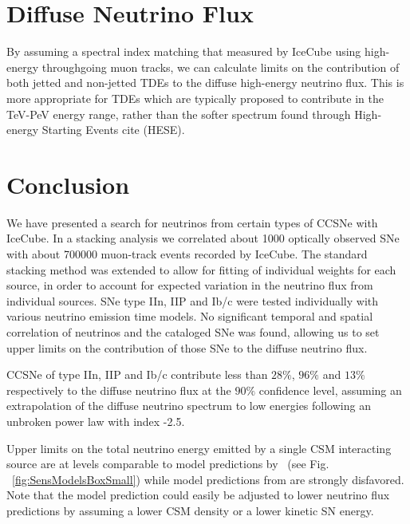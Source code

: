 \documentclass[twocolumn, tighten, linenumbers]{aastex62}
\begin{document}
\section{Diffuse Neutrino Flux}
\label{sec:DiffuseNeutrinoFlux}

By assuming a spectral index matching that measured by IceCube using high-energy throughgoing muon tracks, we can calculate limits on the contribution of both jetted and non-jetted TDEs to the diffuse high-energy neutrino flux. This is more appropriate for TDEs which are typically proposed to contribute in the TeV-PeV energy range, rather than the softer spectrum found through High-energy Starting Events cite (HESE). 


\section{Conclusion}
\label{sec:Conclusion}
We have presented a search for neutrinos from certain types of CCSNe with IceCube. In a stacking analysis we correlated about 1000 optically observed SNe with about 700000 muon-track events recorded by IceCube. The standard stacking method was extended to allow for fitting of individual weights for each source, in order to account for expected variation in the neutrino flux from individual sources.
SNe type IIn, IIP and Ib/c were tested individually with various neutrino emission time models. No significant temporal and spatial correlation of neutrinos and the cataloged SNe was found, allowing us to set upper limits on the contribution of those SNe to the diffuse neutrino flux. 

CCSNe of type IIn, IIP and Ib/c contribute less than $28\%$, $96\%$ and $13\%$ respectively to the diffuse neutrino flux at the $90\%$ confidence level, assuming an extrapolation of the diffuse neutrino spectrum to low energies following an unbroken power law with index -2.5.

Upper limits on the total neutrino energy emitted by a single CSM interacting source are at levels comparable to model predictions by~\citet{Murase:2010cu} (see Fig. ~\ref{fig:SensModelsBoxSmall}) while model predictions from \citet{Zirakashvili:2015mua} are strongly disfavored. Note that the model prediction could easily be adjusted to lower neutrino flux predictions by assuming a lower CSM density or a lower kinetic SN energy. %
\end{document}
